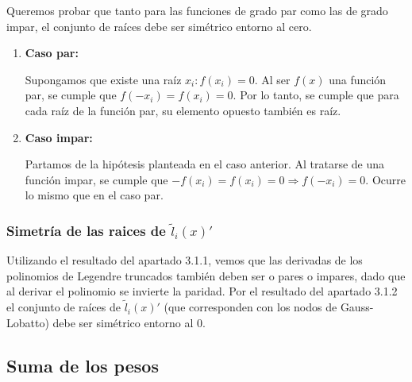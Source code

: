 \documentclass[a4paper]{article}
\begin{document}
Queremos probar que tanto para las funciones de grado par como las de grado impar, el conjunto de raíces debe ser simétrico entorno al cero.
\begin{enumerate}
\item \textbf{Caso par:}

Supongamos que existe una raíz $x_i:f(x_i)=0$. Al ser $f(x)$ una función par, se cumple que $f(-x_i)=f(x_i)=0$. Por lo tanto, se cumple que para cada raíz de la función par, su elemento opuesto también es raíz.

\item \textbf{Caso impar:}

Partamos de la hipótesis planteada en el caso anterior. Al tratarse de una función impar, se cumple que $-f(x_i)=f(x_i)=0\Rightarrow f(-x_i)=0$. Ocurre lo mismo que en el caso par.
\end{enumerate}
\subsubsection{\boldmath Simetría de las raices de $\tilde l_i(x)'$}

Utilizando el resultado del apartado 3.1.1, vemos que las derivadas de los polinomios de Legendre truncados también deben ser o pares o impares, dado que al derivar el polinomio se invierte la paridad. Por el resultado del apartado 3.1.2 el conjunto de raíces de $\tilde l_i(x)'$ (que corresponden con los nodos de Gauss-Lobatto) debe ser simétrico entorno al 0.

\subsection{Suma de los pesos}
\end{document}
